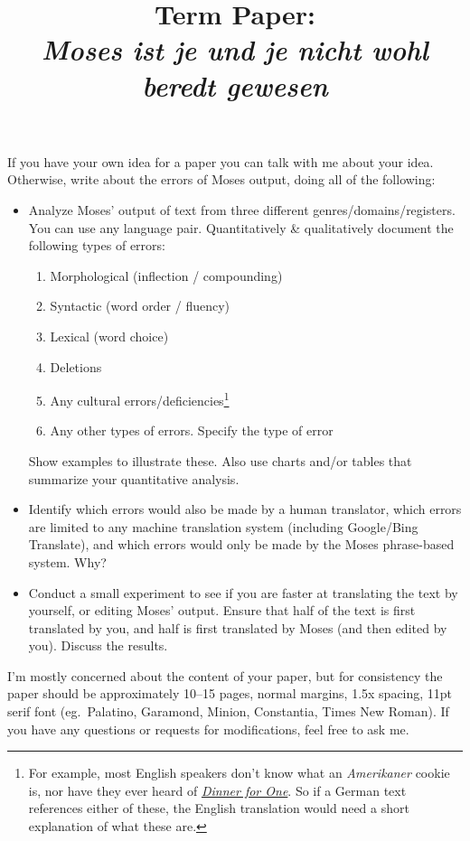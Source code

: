 \documentclass[11pt]{article}
\title{Term Paper: \\[1.0em] \Large{\textit{Moses ist je und je nicht wohl beredt gewesen}}}
\begin{document}
\maketitle


\begin{spacing}{1.35}

If you have your own idea for a paper you can talk with me about your idea.
Otherwise, write about the errors of Moses output, doing all of the following:

\begin{itemize}
\item Analyze Moses' output of text from three different genres/domains/registers.
	You can use any language pair.
	Quantitatively \& qualitatively document the following types of errors:
 \begin{spacing}{0.9}
 \begin{enumerate}
  \item Morphological (inflection / compounding)
  \item Syntactic (word order / fluency)
  \item Lexical (word choice)
  \item Deletions
  \item Any cultural errors/deficiencies\footnote{For example, most English speakers don't know what an \textit{Amerikaner} cookie is, nor have they ever heard of \href{https://en.wikipedia.org/wiki/Dinner_for_One}{\textit{Dinner for One}}.  So if a German text references either of these, the English translation would need a short explanation of what these are.}
  \item Any other types of errors.  Specify the type of error
 \end{enumerate}
 \end{spacing}

 Show examples to illustrate these.
 Also use charts and/or tables that summarize your quantitative analysis.

\item Identify which errors would also be made by a human translator, which errors are limited to any machine translation system (including Google/Bing Translate), and which errors would only be made by the Moses phrase-based system.
	Why?

\item Conduct a small experiment to see if you are faster at translating the text by yourself, or editing Moses' output.
	Ensure that half of the text is first translated by you, and half is first translated by Moses (and then edited by you).
	Discuss the results.

\end{itemize}

I'm mostly concerned about the content of your paper, but for consistency the paper should be approximately 10--15 pages, normal margins, 1.5x spacing, 11pt serif font (eg.~Palatino, Garamond, Minion, Constantia, Times New Roman).
If you have any questions or requests for modifications, feel free to ask me.


\end{spacing}
%
\end{document}
